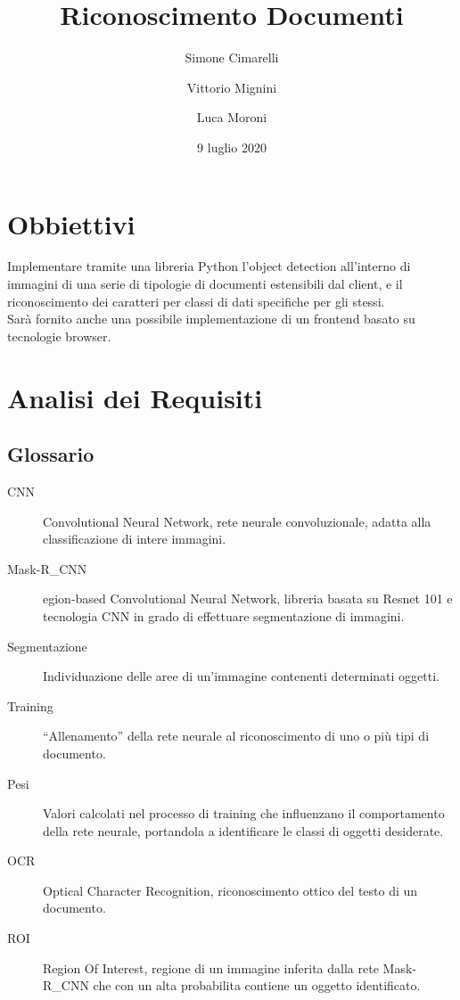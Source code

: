 \documentclass[12pt,a4paper]{article}
\begin{document}
\title{Riconoscimento Documenti}
\author{Simone Cimarelli \and Vittorio Mignini \and Luca Moroni}
\date{9 luglio 2020}

\maketitle

\begin{abstract}
\end{abstract}

\section{Obbiettivi}

Implementare tramite una libreria Python l'object detection all'interno
di immagini di una serie di tipologie di documenti estensibili dal
client, e il riconoscimento dei caratteri per classi di dati specifiche
per gli stessi.\\
Sarà fornito anche una possibile implementazione di un frontend basato
su tecnologie browser.

\section{Analisi dei Requisiti}
\subsection{Glossario}

\begin{description}
    \item[CNN] Convolutional Neural Network, rete neurale
        convoluzionale, adatta alla classificazione di intere immagini.

    \item[Mask-R\_CNN] egion-based Convolutional Neural Network, libreria
        basata su Resnet 101 e tecnologia CNN in grado di effettuare
        segmentazione di immagini.

    \item[Segmentazione] Individuazione delle aree di un'immagine
        contenenti determinati oggetti.

    \item[Training] ``Allenamento'' della rete neurale al riconoscimento
        di uno o più tipi di documento.

    \item[Pesi] Valori calcolati nel processo di training che
        influenzano il comportamento della rete neurale, portandola a
        identificare le classi di oggetti desiderate.

    \item[OCR] Optical Character Recognition, riconoscimento ottico del
        testo di un documento.

    \item[ROI] Region Of Interest, regione di un immagine inferita dalla
        rete Mask-R\_CNN che con un alta probabilita contiene un oggetto
        identificato.

\end{description}
\end{document}
